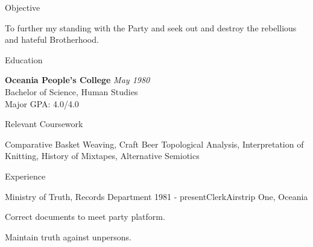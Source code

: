 \documentclass{resume}
\begin{document}

\begin{rSection}{Objective}

To further my standing with the Party and seek out and destroy the rebellious %
and hateful Brotherhood.

\end{rSection}


\begin{rSection}{Education}

{\bf Oceania People's College} \hfill {\em May 1980} \\
Bachelor of Science, Human Studies \\
Major GPA: 4.0/4.0

\end{rSection}

\begin{rSection}{Relevant Coursework}

Comparative Basket Weaving, Craft Beer Topological Analysis, Interpretation of %
Knitting, History of Mixtapes, Alternative Semiotics

\end{rSection}


\begin{rSection}{Experience}

\begin{rSubsection}{Ministry of Truth, Records Department}
{1981 - present}{Clerk}{Airstrip One, Oceania}
\item Correct documents to meet party platform.
\item Maintain truth against unpersons.
\end{rSubsection}

\end{rSection}
\end{document}
